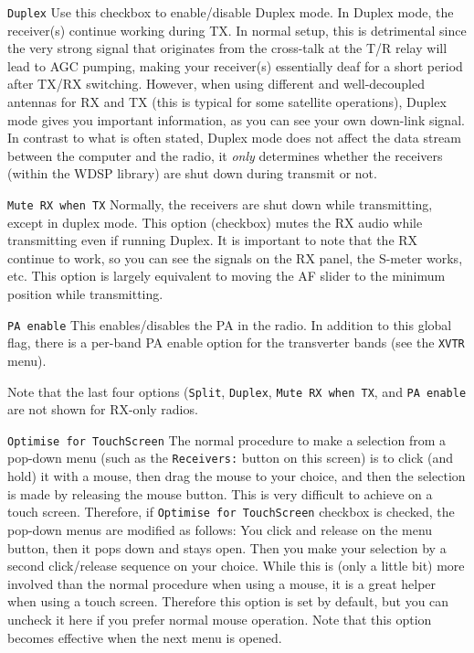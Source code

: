 \documentclass[12pt]{book}
\def\rett#1{\texttt{\color{red}#1}}
\def\bltt#1{\texttt{\color{blue}#1}}
\begin{document}
\rett{Duplex} Use this checkbox to enable/disable Duplex mode. In Duplex mode, the receiver(s)
continue working during TX. In normal setup, this is detrimental since the very strong
signal that originates from the cross-talk at the T/R relay will lead to AGC pumping,
making your receiver(s) essentially deaf for a short period after TX/RX switching.
However, when using different and well-decoupled antennas for RX and TX (this is typical
for some satellite operations), Duplex mode gives you important information, as you can
see your own down-link signal. In contrast to what is often stated, Duplex mode does not
affect the data stream between the computer and the radio, it \textit{only} determines
whether the receivers (within the WDSP library) are shut down during transmit or not.

\rett{Mute RX when TX} Normally, the receivers are shut down while transmitting, except
in duplex mode. This option (checkbox) mutes the RX audio while transmitting even if running
Duplex. It is important
to note that the RX continue to work, so you can see the signals on the RX panel, the
S-meter works, etc. This option is largely equivalent to moving the AF slider to the
minimum position while transmitting.

\rett{PA enable} This enables/disables the PA in the radio. In addition to this global
flag, there is a per-band PA enable option for the transverter bands (see the \bltt{XVTR}
menu).

Note that the last four options (\rett{Split}, \rett{Duplex}, \rett{Mute RX when TX},
and \rett{PA enable} are not shown for RX-only radios.

\rett{Optimise for TouchScreen} The normal procedure to make a selection from a
pop-down menu (such as the \rett{Receivers:} button on this screen) is to click
(and hold) it with a mouse, then drag the mouse to your choice, and then the selection
is made by releasing the mouse button. This is very difficult to achieve on a touch
screen. Therefore, if \rett{Optimise for TouchScreen} checkbox is checked, the pop-down
menus are modified as follows: You click and release on the menu button, then it pops
down and stays open. Then you make your selection by a second click/release sequence
on your choice. While this is (only a little bit) more involved than the normal procedure
when using a mouse, it is a great helper when using a touch screen. Therefore this
option is set by default, but you can uncheck it here if you prefer normal
mouse operation. Note that this option becomes effective when the next menu is opened.
\end{document}
